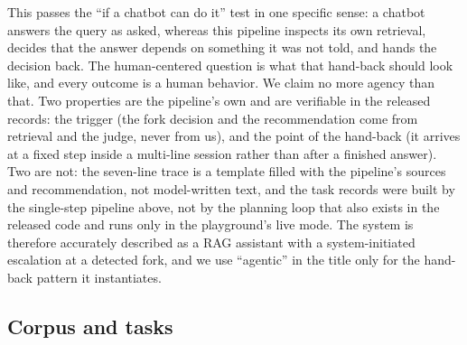 \documentclass[sigconf,nonacm]{acmart}
\begin{document}
This passes the ``if a chatbot can do it'' test in one specific sense: a
chatbot answers the query as asked, whereas this pipeline inspects its own
retrieval, decides that the answer depends on something it was not told,
and hands the decision back. The human-centered question is what that
hand-back should look like, and every outcome is a human behavior. We
claim no more agency than that. Two properties are the pipeline's own and
are verifiable in the released records: the trigger (the fork decision and
the recommendation come from retrieval and the judge, never from us), and
the point of the hand-back (it arrives at a fixed step inside a
multi-line session rather than after a finished answer). Two are not: the
seven-line trace is a template filled with the pipeline's sources and
recommendation, not model-written text, and the task records were built
by the single-step pipeline above, not by the planning loop that also
exists in the released code and runs only in the playground's live mode.
The system is therefore accurately described as a RAG assistant with a
system-initiated escalation at a detected fork, and we use ``agentic'' in
the title only for the hand-back pattern it instantiates.

\subsection{Corpus and tasks}
\label{sec:corpus}
\end{document}
